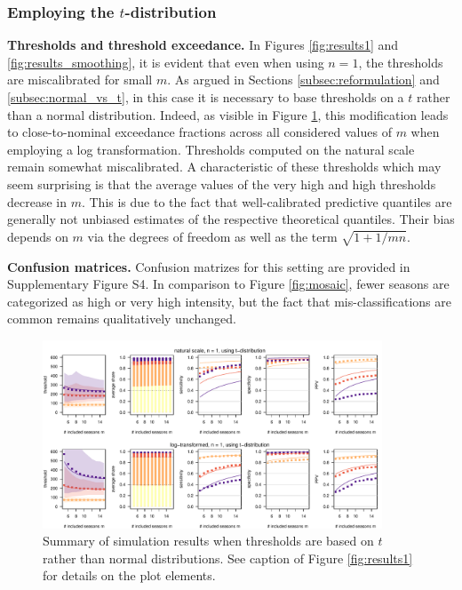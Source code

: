 \documentclass[12pt]{article}
\begin{document}
\subsubsection{Employing the $t$-distribution}

\textbf{Thresholds and threshold exceedance.} In Figures \ref{fig:results1} and \ref{fig:results_smoothing}, it is evident that even when using $n = 1$, the thresholds are miscalibrated for small $m$. As argued in Sections \ref{subsec:reformulation} and \ref{subsec:normal_vs_t}, in this case it is necessary to base thresholds on a $t$ rather than a normal distribution. Indeed, as visible in Figure \ref{fig:t}, this modification leads to close-to-nominal exceedance fractions across all considered values of $m$ when employing a log transformation. Thresholds computed on the natural scale remain somewhat miscalibrated. A characteristic of these thresholds which may seem surprising is that the average values of the very high and high thresholds decrease in $m$. This is due to the fact that well-calibrated predictive quantiles are generally not unbiased estimates of the respective theoretical quantiles. Their bias depends on $m$ via the degrees of freedom as well as the term $\sqrt{1 + 1/mn}$.

\textbf{Confusion matrices.} Confusion matrizes for this setting are provided in Supplementary Figure S4. In comparison to Figure \ref{fig:mosaic}, fewer seasons are categorized as high or very high intensity, but the fact that mis-classifications are common remains qualitatively unchanged.

\begin{figure}[h!]
\begin{center}
\includegraphics[width = 0.9\textwidth]{figure/plot_t_fr_small.pdf}\vspace{-5mm}
\end{center}
\caption{Summary of simulation results when thresholds are based on $t$ rather than normal distributions. See caption of Figure \ref{fig:results1} for details on the plot elements.}
\label{fig:t}
\end{figure}
\end{document}
